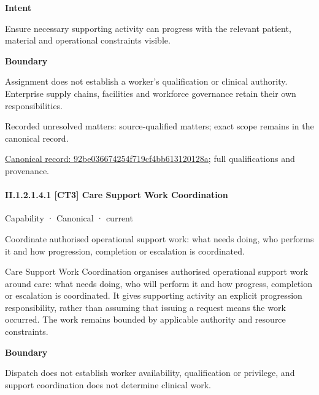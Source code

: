 \textbf{Intent}



Ensure necessary supporting activity can progress with the relevant patient, material and operational constraints visible.



\textbf{Boundary}



Assignment does not establish a worker's qualification or clinical authority. Enterprise supply chains, facilities and workforce governance retain their own responsibilities.


{\small Recorded unresolved matters: source-qualified matters; exact scope remains in the canonical record.}\par
{\footnotesize \href{../../../../continuum/strategy/capability/92be036674254f719cf4bb613120128a.md}{Canonical record: 92be036674254f719cf4bb613120128a}; full qualifications and provenance.}\par
\paragraph*{II.1.2.1.4.1 [CT3] Care Support Work Coordination}
\label{navigation:II.1.2.1.4.1}

\label{element:f9f5c69b0f0b472287cd4ac56ccff6f3}
{\small Capability · Canonical · current}\par

Coordinate authorised operational support work: what needs doing, who performs it and how progression, completion or escalation is coordinated.



Care Support Work Coordination organises authorised operational support work around care: what needs doing, who will perform it and how progress, completion or escalation is coordinated. It gives supporting activity an explicit progression responsibility, rather than assuming that issuing a request means the work occurred. The work remains bounded by applicable authority and resource constraints.



\textbf{Boundary}



Dispatch does not establish worker availability, qualification or privilege, and support coordination does not determine clinical work.


